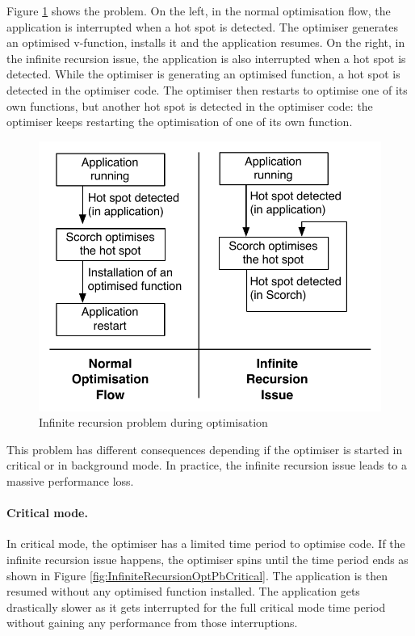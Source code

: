 \documentclass[a4paper,12pt,twoside]{../includes/ThesisStyle}
\begin{document}
Figure \ref{fig:InfiniteRecursionOptPb} shows the problem. On the left, in the normal optimisation flow, the application is interrupted when a hot spot is detected. The optimiser generates an optimised v-function, installs it and the application resumes. On the right, in the infinite recursion issue, the application is also interrupted when a hot spot is detected. While the optimiser is generating an optimised function, a hot spot is detected in the optimiser code. The optimiser then restarts to optimise one of its own functions, but another hot spot is detected in the optimiser code: the optimiser keeps restarting the optimisation of one of its own function.

\begin{figure}[h!]
    \begin{center}
        \includegraphics[width=0.65\linewidth]{InfiniteRecursionOptPb}
        \caption{Infinite recursion problem during optimisation}
        \label{fig:InfiniteRecursionOptPb}
    \end{center}
\end{figure}

This problem has different consequences depending if the optimiser is started in critical or in background mode. In practice, the infinite recursion issue leads to a massive performance loss.

\paragraph{Critical mode.} In critical mode, the optimiser has a limited time period to optimise code. If the infinite recursion issue happens, the optimiser spins until the time period ends as shown in Figure \ref{fig:InfiniteRecursionOptPbCritical}. The application is then resumed without any optimised function installed. The application gets drastically slower as it gets interrupted for the full critical mode time period without gaining any performance from those interruptions.
\end{document}
